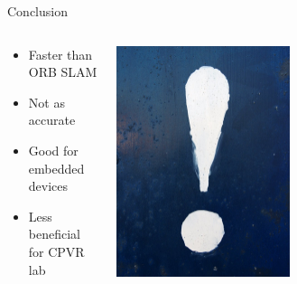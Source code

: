 \documentclass[aspectratio=169,12pt]{beamer}
\begin{document}
\begin{frame}{Conclusion}
  \begin{columns}[c]
    \begin{column}{0.4\linewidth}
      \begin{itemize}
        \item Faster than ORB SLAM
        \item Not as accurate
        \item Good for embedded devices
        \item Less beneficial for CPVR lab
      \end{itemize}
    \end{column}
    \begin{column}{0.4\linewidth}
      \begin{center}
        \includegraphics[width=0.5\textwidth]{./img/exclamationmark.jpg}
      \end{center}
    \end{column}
  \end{columns}
\end{frame}
\end{document}
